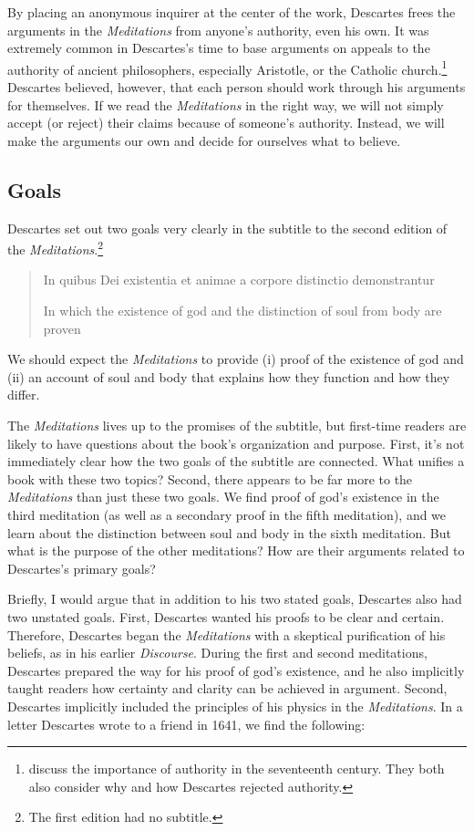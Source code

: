 By placing an anonymous inquirer at the center of the work, Descartes frees the arguments in the \textit{Meditations} from anyone's authority, even his own. It was extremely common in Descartes's time to base arguments on appeals to the authority of ancient philosophers, especially Aristotle, or the Catholic church.\footnote{\textcites[4--7]{cottingham1986}[4--5]{garber1998} discuss the importance of authority in the seventeenth century. They both also consider why and how Descartes rejected authority.} Descartes believed, however, that each person should work through his arguments for themselves. If we read the \textit{Meditations} in the right way, we will not simply accept (or reject) their claims because of someone's authority. Instead, we will make the arguments our own and decide for ourselves what to believe.

\subsection*{Goals}

Descartes set out two goals very clearly in the subtitle to the second edition of the \textit{Meditations}.\footnote{The first edition had no subtitle.}

\begin{quote}
    In quibus Dei existentia et animae a corpore distinctio demonstrantur

    In which the existence of god and the distinction of soul from body are proven
\end{quote}
We should expect the \textit{Meditations} to provide (i) proof of the existence of god and (ii) an account of soul and body that explains how they function and how they differ.

The \textit{Meditations} lives up to the promises of the subtitle, but first-time readers are likely to have questions about the book's organization and purpose. First, it's not immediately clear how the two goals of the subtitle are connected. What unifies a book with these two topics? Second, there appears to be far more to the \textit{Meditations} than just these two goals. We find proof of god's existence in the third meditation (as well as a secondary proof in the fifth meditation), and we learn about the distinction between soul and body in the sixth meditation. But what is the purpose of the other meditations? How are their arguments related to Descartes's primary goals?

Briefly, I would argue that in addition to his two stated goals, Descartes also had two unstated goals. First, Descartes wanted his proofs to be clear and certain. Therefore, Descartes began the \textit{Meditations} with a skeptical purification of his beliefs, as in his earlier \textit{Discourse}. During the first and second meditations, Descartes prepared the way for his proof of god's existence, and he also implicitly taught readers how certainty and clarity can be achieved in argument. Second, Descartes implicitly included the principles of his physics in the \textit{Meditations}. In a letter Descartes wrote to a friend in 1641, we find the following:

